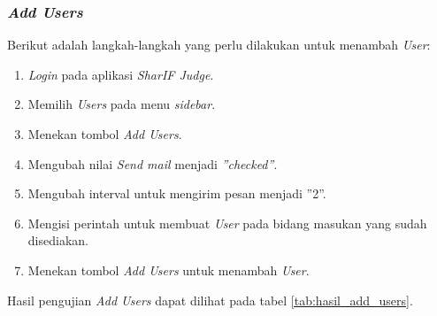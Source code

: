 \subsubsection{\textit{Add Users}}
\label{subsubsec:skenario_add_users}
Berikut adalah langkah-langkah yang perlu dilakukan untuk menambah \textit{User}:

\begin{enumerate}
	\item \textit{Login} pada aplikasi \textit{SharIF Judge}.
	\item Memilih \textit{Users} pada menu \textit{sidebar}.
	\item Menekan tombol \textit{Add Users}.
	\item Mengubah nilai \textit{Send mail} menjadi \textit{''checked''}.
	\item Mengubah interval untuk mengirim pesan menjadi ''2''.
	\item Mengisi perintah untuk membuat \textit{User} pada bidang masukan yang sudah disediakan.
	\item Menekan tombol \textit{Add Users} untuk menambah \textit{User}.
\end{enumerate}

Hasil pengujian \textit{Add Users} dapat dilihat pada tabel \ref{tab:hasil_add_users}.

